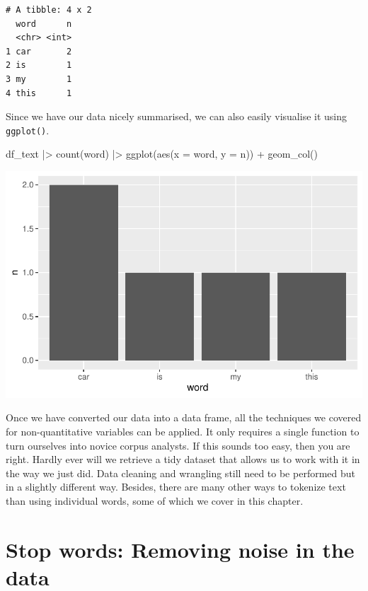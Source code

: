 \documentclass[
  letterpaper,
]{krantz}
\makeatletter
\newenvironment{Shaded}{\begin{snugshade}}{\end{snugshade}}
\newcommand{\AttributeTok}[1]{\textcolor[rgb]{0.40,0.45,0.13}{#1}}
\newcommand{\FunctionTok}[1]{\textcolor[rgb]{0.28,0.35,0.67}{#1}}
\newcommand{\NormalTok}[1]{\textcolor[rgb]{0.00,0.23,0.31}{#1}}
\newcommand{\SpecialCharTok}[1]{\textcolor[rgb]{0.37,0.37,0.37}{#1}}
\newenvironment{kframe}{%
\medskip{}
\setlength{\fboxsep}{.8em}
 \def\at@end@of@kframe{}%
 \ifinner\ifhmode%
  \def\at@end@of@kframe{\end{minipage}}%
  \begin{minipage}{\columnwidth}%
 \fi\fi%
 \def\FrameCommand##1{\hskip\@totalleftmargin \hskip-\fboxsep
 \colorbox{shadecolor}{##1}\hskip-\fboxsep
     \hskip-\linewidth \hskip-\@totalleftmargin \hskip\columnwidth}%
 \MakeFramed {\advance\hsize-\width
   \@totalleftmargin\z@ \linewidth\hsize
   \@setminipage}}%
 {\par\unskip\endMakeFramed%
 \at@end@of@kframe}
\renewenvironment{Shaded}{\begin{kframe}}{\end{kframe}}
\makeatother
\begin{document}
\begin{verbatim}
# A tibble: 4 x 2
  word      n
  <chr> <int>
1 car       2
2 is        1
3 my        1
4 this      1
\end{verbatim}

Since we have our data nicely summarised, we can also easily visualise
it using \texttt{ggplot()}.

\begin{Shaded}
\begin{Highlighting}[]
\NormalTok{df\_text }\SpecialCharTok{|\textgreater{}}
  \FunctionTok{count}\NormalTok{(word) }\SpecialCharTok{|\textgreater{}}
  \FunctionTok{ggplot}\NormalTok{(}\FunctionTok{aes}\NormalTok{(}\AttributeTok{x =}\NormalTok{ word,}
             \AttributeTok{y =}\NormalTok{ n)) }\SpecialCharTok{+}
  \FunctionTok{geom\_col}\NormalTok{()}
\end{Highlighting}
\end{Shaded}

\includegraphics{14_mixed_methods_files/figure-pdf/visualise-word-freq-1.pdf}

Once we have converted our data into a data frame, all the techniques we
covered for non-quantitative variables can be applied. It only requires
a single function to turn ourselves into novice corpus analysts. If this
sounds too easy, then you are right. Hardly ever will we retrieve a tidy
dataset that allows us to work with it in the way we just did. Data
cleaning and wrangling still need to be performed but in a slightly
different way. Besides, there are many other ways to tokenize text than
using individual words, some of which we cover in this chapter.

\section{Stop words: Removing noise in the
data}\label{stop-words-removing-noise-in-the-data}
\end{document}

